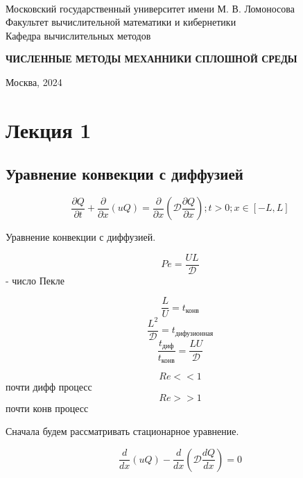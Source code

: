 \documentclass[12pt, a4paper]{article}
\begin{document}
\thispagestyle{empty}

\begin{center}
	\ \vspace{-1cm}

	{Московский государственный университет имени М. В. Ломоносова}\\
	Факультет вычислительной математики и кибернетики\\
	Кафедра вычислительных методов

	\vspace{8cm}
	\begin{spacing}{2.5}
		{\huge \bfseries ЧИСЛЕННЫЕ МЕТОДЫ МЕХАННИКИ СПЛОШНОЙ СРЕДЫ}
	\end{spacing}


\end{center}

\vfill

\begin{center}
	Москва, 2024
\end{center}

\enlargethispage{2\baselineskip}

\newpage

\tableofcontents

\newpage

\section{Лекция 1}

\subsection{Уравнение конвекции с диффузией}

\[ \frac{\partial Q}{\partial t} +\frac{\partial }{\partial x} (u Q) = \frac{\partial }{\partial x} (\mathcal{D} \frac{\partial Q}{\partial x}); t>0; x \in [-L, L] \]

Уравнение конвекции с диффузией.

\[ Pe = \frac{UL}{\mathcal{D}} \] - число Пекле

\[ \frac{L}{U} = t_{\textrm{конв}} \]
\[ \frac{L^2}{\mathcal{D}} = t_{\textrm{дифузионная}} \]
\[ \frac{t_{\textrm{диф}}}{t_{\textrm{конв}}} = \frac{L U}{\mathcal{D}} \]

\[ Re << 1 \] почти дифф процесс
\[ Re >> 1 \] почти конв процесс

Сначала будем рассматривать стационарное уравнение.

\[ \frac{d}{dx}(uQ) - \frac{d}{dx} (\mathcal{D} \frac{d Q}{d x}) = 0 \]
\end{document}
